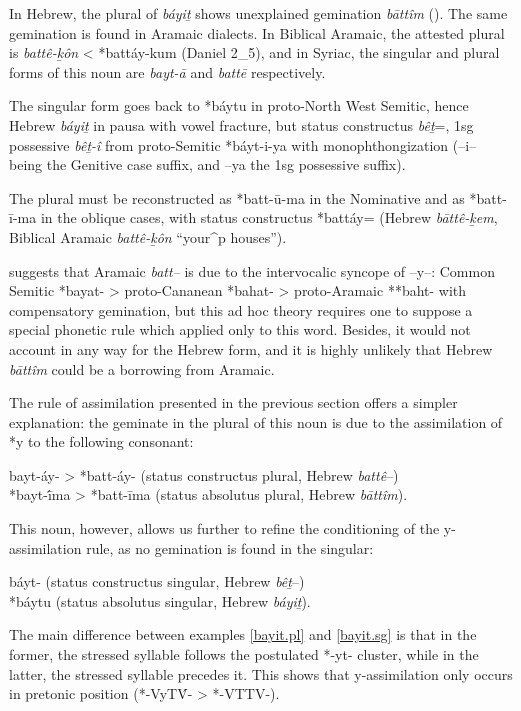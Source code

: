 \documentclass[oldfontcommands,oneside,a4paper,11pt]{article}
\newcommand{\forme}[1]{\textit{#1}}
\begin{document}
\begin{sloppypar}
In Hebrew, the plural of \forme{báyiṯ} shows unexplained gemination \forme{bāttîm} (\citealt[294]{jouon06}). The same gemination is found in Aramaic dialects. In Biblical Aramaic, the attested plural is \forme{battê-ḵôn} < *battáy-kum (Daniel 2_5), and in Syriac, the singular and plural forms of this noun are \forme{bayt-ā} and \forme{battē} respectively. 

The singular form goes back to *báytu in proto-North West Semitic, hence Hebrew \forme{báyiṯ} in pausa with vowel fracture, but status constructus \forme{bêṯ}=, 1sg possessive \forme{bêṯ-î} from proto-Semitic *báyt-i-ya with monophthongization (--i-- being the Genitive case suffix, and --ya the 1sg possessive suffix).

The plural must be reconstructed as *batt-ū-ma in the Nominative and as *batt-ī-ma in the oblique cases, with status constructus *battáy= (Hebrew  \forme{bāttê-ḵem}, Biblical Aramaic \forme{battê-ḵôn} ``your^p houses''). 

\citet[294, fn. 4]{jouon06} suggests that Aramaic \forme{batt--} is due to the intervocalic syncope of --y--: Common Semitic *bayat- > proto-Cananean *bahat- > proto-Aramaic **baht- with compensatory gemination, but this ad hoc theory requires one to suppose a special phonetic rule which applied only to this word. Besides, it would not account in any way for the Hebrew form, and it is highly unlikely that Hebrew \forme{bāttîm} could be a borrowing from Aramaic.




The rule of assimilation presented in the previous section offers a simpler explanation: the geminate in the plural of this noun is due to the assimilation of *y to the following consonant:
\begin{exe} 
\ex *bayt-áy- > *batt-áy- (status constructus plural, Hebrew  \forme{battê}--) \\ \label{bayit.pl}
  *bayt-ī́ma > *batt-īma (status absolutus plural, Hebrew \forme{bāttîm}).
\end{exe}
This noun, however, allows us   further to refine the conditioning of the y-assimilation rule, as no gemination is found in  the singular:
\begin{exe} 
\ex *báyt-  (status constructus singular, Hebrew  \forme{bêṯ}--) \\ \label{bayit.sg}
 *báytu (status absolutus singular, Hebrew \forme{báyiṯ}). 
\end{exe}
The main difference between examples \ref{bayit.pl} and \ref{bayit.sg} is that in the former, the stressed syllable follows the postulated *-yt- cluster, while in the latter, the stressed syllable precedes it. This shows that y-assimilation only occurs in pretonic position (*-VyTV́- > *-VTTV-). 


\end{sloppypar}
\end{document}
